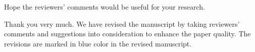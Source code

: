 \begin{Editor}
  \begin{CommentSummary}
    Hope the reviewers' comments would be useful for your research.
  \end{CommentSummary}

  \begin{Response}
    Thank you very much.
    We have revised the manuscript by taking reviewers’ comments and suggestions into consideration to enhance the paper quality.
    The revisions are marked in {\color{blue}blue} color in the revised manuscript.
  \end{Response}
\end{Editor}